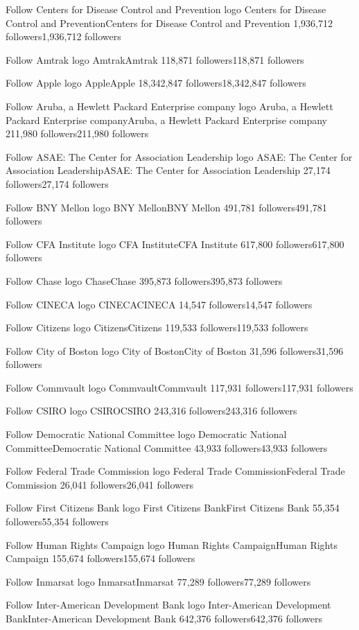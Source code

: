 Follow
Centers for Disease Control and Prevention logo
Centers for Disease Control and PreventionCenters for Disease Control and Prevention
1,936,712 followers1,936,712 followers

Follow
Amtrak logo
AmtrakAmtrak
118,871 followers118,871 followers

Follow
Apple logo
AppleApple
18,342,847 followers18,342,847 followers

Follow
Aruba, a Hewlett Packard Enterprise company logo
Aruba, a Hewlett Packard Enterprise companyAruba, a Hewlett Packard Enterprise company
211,980 followers211,980 followers

Follow
ASAE: The Center for Association Leadership logo
ASAE: The Center for Association LeadershipASAE: The Center for Association Leadership
27,174 followers27,174 followers

Follow
BNY Mellon logo
BNY MellonBNY Mellon
491,781 followers491,781 followers

Follow
CFA Institute logo
CFA InstituteCFA Institute
617,800 followers617,800 followers

Follow
Chase logo
ChaseChase
395,873 followers395,873 followers

Follow
CINECA logo
CINECACINECA
14,547 followers14,547 followers

Follow
Citizens logo
CitizensCitizens
119,533 followers119,533 followers

Follow
City of Boston logo
City of BostonCity of Boston
31,596 followers31,596 followers

Follow
Commvault logo
CommvaultCommvault
117,931 followers117,931 followers

Follow
CSIRO logo
CSIROCSIRO
243,316 followers243,316 followers

Follow
Democratic National Committee logo
Democratic National CommitteeDemocratic National Committee
43,933 followers43,933 followers

Follow
Federal Trade Commission logo
Federal Trade CommissionFederal Trade Commission
26,041 followers26,041 followers

Follow
First Citizens Bank logo
First Citizens BankFirst Citizens Bank
55,354 followers55,354 followers

Follow
Human Rights Campaign logo
Human Rights CampaignHuman Rights Campaign
155,674 followers155,674 followers

Follow
Inmarsat logo
InmarsatInmarsat
77,289 followers77,289 followers

Follow
Inter-American Development Bank logo
Inter-American Development BankInter-American Development Bank
642,376 followers642,376 followers

